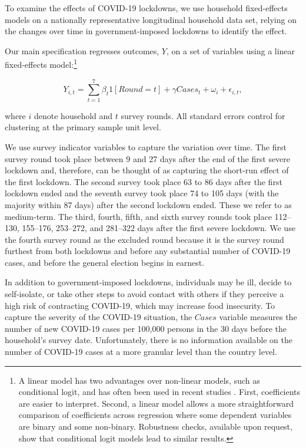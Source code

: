 \documentclass{wber}
\begin{document}
To examine the effects of COVID-19 lockdowns, we use household
fixed-effects models on a nationally representative longitudinal
household data set, relying on the changes over time in
government-imposed lockdowns to identify the effect.

Our main specification regresses outcomes, \(Y\), on a set of variables
using a linear fixed-effects model:\footnote{A linear model has two
  advantages over non-linear models, such as conditional logit, and has
  often been used in recent studies
  \citep{Alam2020, Alam2018, Charles2008}. First, coefficients are
  easier to interpret. Second, a linear model allows a more
  straightforward comparison of coefficients across regression where
  some dependent variables are binary and some non-binary. Robustness
  checks, available upon request, show that conditional logit models
  lead to similar results.}

\[
Y_{i,t} =  \sum_{t=1}^7 \beta_t 1[Round = t]  + \gamma Cases_{t} 
+ \omega_i + \epsilon_{i,t}, 
\]

where \(i\) denote household and \(t\) survey rounds. All standard
errors control for clustering at the primary sample unit level.

We use survey indicator variables to capture the variation over time.
The first survey round took place between 9 and 27 days after the end of
the first severe lockdown and, therefore, can be thought of as capturing
the short-run effect of the first lockdown. The second survey took place
63 to 86 days after the first lockdown ended and the seventh survey took
place 74 to 105 days (with the majority within 87 days) after the second
lockdown ended. These we refer to as medium-term. The third, fourth,
fifth, and sixth survey rounds took place 112--130, 155--176, 253--272,
and 281--322 days after the first severe lockdown. We use the fourth
survey round as the excluded round because it is the survey round
furthest from both lockdowns and before any substantial number of
COVID-19 cases, and before the general election begins in earnest.

In addition to government-imposed lockdowns, individuals may be ill,
decide to self-isolate, or take other steps to avoid contact with others
if they perceive a high risk of contracting COVID-19, which may increase
food insecurity. To capture the severity of the COVID-19 situation, the
\(Cases\) variable measures the number of new COVID-19 cases per 100,000
persons in the 30 days before the household's survey date.
Unfortunately, there is no information available on the number of
COVID-19 cases at a more granular level than the country level.
\end{document}
